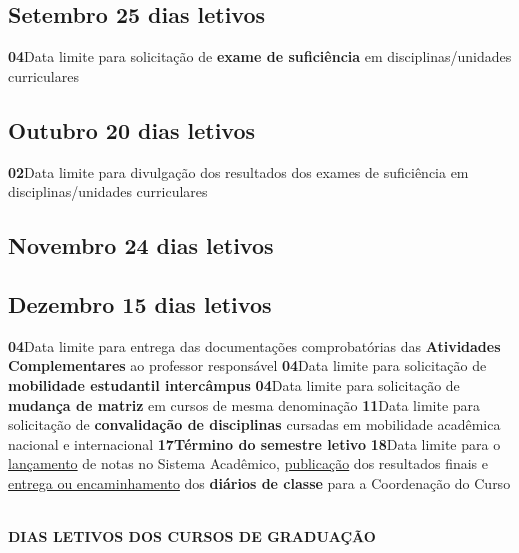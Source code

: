 \documentclass[thesis]{hmcposter}
\begin{document}
\begin{poster}
\subsection{Setembro \hfill 25 dias letivos}\textbf{04}\qquad Data limite para solicitação de \textbf{exame de suficiência} em disciplinas/unidades curriculares \newline \null\subsection{Outubro \hfill 20 dias letivos}\textbf{02}\qquad Data limite para divulgação dos resultados dos exames de suficiência em disciplinas/unidades curriculares \newline \null\subsection{Novembro \hfill 24 dias letivos}\subsection{Dezembro \hfill 15 dias letivos}\textbf{04}\qquad Data limite para entrega das documentações comprobatórias das \textbf{Atividades Complementares} ao professor responsável \newline \null\textbf{04}\qquad Data limite para solicitação de \textbf{mobilidade estudantil intercâmpus} \newline \null\textbf{04}\qquad Data limite para solicitação de \textbf{mudança de matriz} em cursos de mesma denominação \newline \null\textbf{11}\qquad Data limite para solicitação de \textbf{convalidação de disciplinas} cursadas em mobilidade acadêmica nacional e internacional \newline \null\textbf{17}\qquad \textbf{Término do semestre letivo} \newline \null\textbf{18}\qquad Data limite para o \underline{lançamento} de notas no Sistema Acadêmico, \underline{publicação} dos resultados finais e \underline{entrega ou encaminhamento} dos \textbf{diários de classe} para a Coordenação do Curso \newline \null\newpage
~
\vfill
\begin{center}
\large \textbf{DIAS LETIVOS DOS CURSOS DE GRADUAÇÃO}
\newline
\null
\newline
\begin{table}
\centering
{}
\end{table}
\end{center}
\end{poster}
\end{document}
